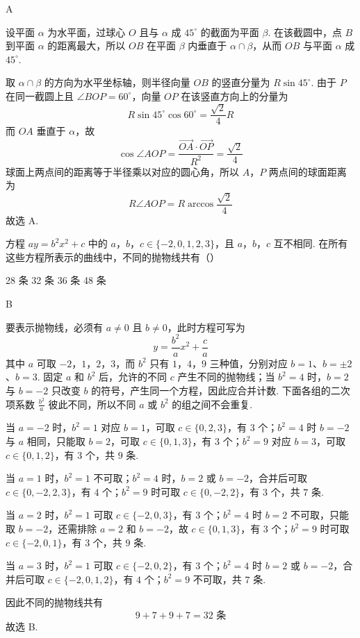 \begin{answer}
A
\end{answer}

\begin{solution}
设平面 \(\alpha\) 为水平面，过球心 \(O\) 且与 \(\alpha\) 成 \(45^{\circ}\) 的截面为平面 \(\beta\). 在该截圆中，点 \(B\) 到平面 \(\alpha\) 的距离最大，所以 \(OB\) 在平面 \(\beta\) 内垂直于 \(\alpha\cap\beta\)，从而 \(OB\) 与平面 \(\alpha\) 成 \(45^{\circ}\).

取 \(\alpha\cap\beta\) 的方向为水平坐标轴，则半径向量 \(OB\) 的竖直分量为 \(R\sin45^{\circ}\). 由于 \(P\) 在同一截圆上且 \(\angle BOP=60^{\circ}\)，向量 \(OP\) 在该竖直方向上的分量为
\[
R\sin45^{\circ}\cos60^{\circ}=\frac{\sqrt2}{4}R
\]
而 \(OA\) 垂直于 \(\alpha\)，故
\[
\cos\angle AOP=\frac{\overrightarrow{OA}\cdot\overrightarrow{OP}}{R^2}=\frac{\sqrt2}{4}
\]
球面上两点间的距离等于半径乘以对应的圆心角，所以 \(A\)，\(P\) 两点间的球面距离为
\[
R\angle AOP=R\arccos\frac{\sqrt2}{4}
\]
故选 A.
\end{solution}

\begin{problem}
方程 \(ay = b^2 x^2 + c\) 中的 \(a\)，\(b\)，\(c \in \{-2, 0, 1, 2, 3\}\)，且 \(a\)，\(b\)，\(c\) 互不相同. 在所有这些方程所表示的曲线中，不同的抛物线共有（\quad）

\choices
    {28 条}
    {32 条}
    {36 条}
    {48 条}
\end{problem}

\begin{answer}
B
\end{answer}

\begin{solution}
要表示抛物线，必须有 \(a\ne0\) 且 \(b\ne0\)，此时方程可写为
\[
y=\frac{b^2}{a}x^2+\frac ca
\]
其中 \(a\) 可取 \(-2\)，\(1\)，\(2\)，\(3\)，而 \(b^2\) 只有 \(1\)，\(4\)，\(9\) 三种值，分别对应 \(b=1\)、\(b=\pm2\)、\(b=3\). 固定 \(a\) 和 \(b^2\) 后，允许的不同 \(c\) 产生不同的抛物线；当 \(b^2=4\) 时，\(b=2\) 与 \(b=-2\) 只改变 \(b\) 的符号，产生同一个方程，因此应合并计数. 下面各组的二次项系数 \(\frac{b^2}{a}\) 彼此不同，所以不同 \(a\) 或 \(b^2\) 的组之间不会重复.

当 \(a=-2\) 时，\(b^2=1\) 对应 \(b=1\)，可取 \(c\in\{0,2,3\}\)，有 \(3\) 个；\(b^2=4\) 时 \(b=-2\) 与 \(a\) 相同，只能取 \(b=2\)，可取 \(c\in\{0,1,3\}\)，有 \(3\) 个；\(b^2=9\) 对应 \(b=3\)，可取 \(c\in\{0,1,2\}\)，有 \(3\) 个，共 \(9\) 条.

当 \(a=1\) 时，\(b^2=1\) 不可取；\(b^2=4\) 时，\(b=2\) 或 \(b=-2\)，合并后可取 \(c\in\{0,-2,2,3\}\)，有 \(4\) 个；\(b^2=9\) 时可取 \(c\in\{0,-2,2\}\)，有 \(3\) 个，共 \(7\) 条.

当 \(a=2\) 时，\(b^2=1\) 可取 \(c\in\{-2,0,3\}\)，有 \(3\) 个；\(b^2=4\) 时 \(b=2\) 不可取，只能取 \(b=-2\)，还需排除 \(a=2\) 和 \(b=-2\)，故 \(c\in\{0,1,3\}\)，有 \(3\) 个；\(b^2=9\) 时可取 \(c\in\{-2,0,1\}\)，有 \(3\) 个，共 \(9\) 条.

当 \(a=3\) 时，\(b^2=1\) 可取 \(c\in\{-2,0,2\}\)，有 \(3\) 个；\(b^2=4\) 时 \(b=2\) 或 \(b=-2\)，合并后可取 \(c\in\{-2,0,1,2\}\)，有 \(4\) 个；\(b^2=9\) 不可取，共 \(7\) 条.

因此不同的抛物线共有
\[
9+7+9+7=32\text{ 条}
\]
故选 B.
\end{solution}

